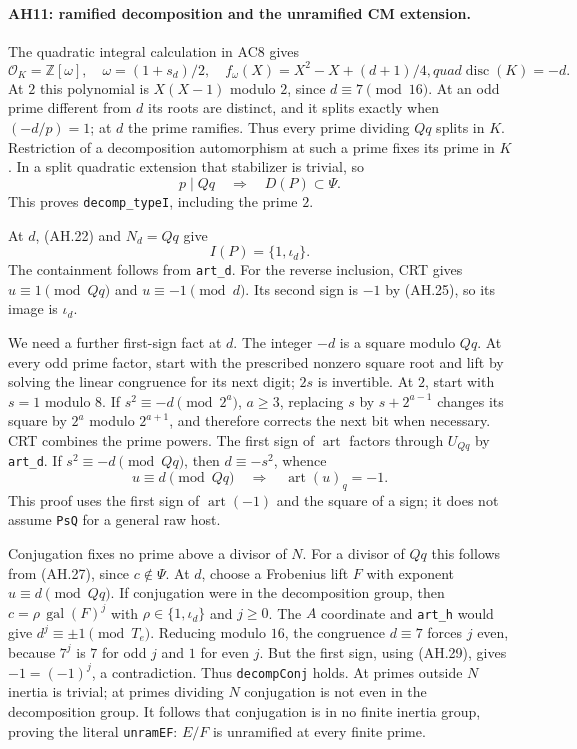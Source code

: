 \paragraph{AH11: ramified decomposition and the unramified CM extension.}
The quadratic integral calculation in AC8 gives
\[
 \mathcal O_K=\mathbb Z[\omega],\quad
 \omega=(1+s_d)/2,\quad
 f_\omega(X)=X^2-X+(d+1)/4,quad \operatorname{disc}(K)=-d.
                                                               \tag{AH.26}
\]
At $2$ this polynomial is $X(X-1)$ modulo $2$, since $d\equiv7\pmod{16}$.
At an odd prime different from $d$ its roots are distinct, and it splits
exactly when $(-d/p)=1$; at $d$ the prime ramifies. Thus every prime
dividing $Qq$ splits in $K$. Restriction of a decomposition automorphism
at such a prime fixes its prime in $K$. In a split quadratic extension
that stabilizer is trivial, so
\[
              p\mid Qq\quad\Longrightarrow\quad D(P)\subset\Psi.
                                                               \tag{AH.27}
\]
This proves \texttt{decomp\_typeI}, including the prime $2$.

At $d$, (AH.22) and $N_d=Qq$ give
\[
                     I(P)=\{1,\iota_d\}.        \tag{AH.28}
\]
The containment follows from \texttt{art\_d}. For the reverse inclusion,
CRT gives $u\equiv1\pmod{Qq}$ and $u\equiv-1\pmod d$.
Its second sign is $-1$ by (AH.25), so its image is $\iota_d$.

We need a further first-sign fact at $d$. The integer $-d$ is a square
modulo $Qq$. At every odd prime factor, start with the prescribed
nonzero square root and lift by solving the linear congruence for its
next digit; $2s$ is invertible. At $2$, start with $s=1$ modulo $8$.
If $s^2\equiv-d\pmod{2^a}$, $a\ge3$, replacing $s$ by
$s+2^{a-1}$ changes its square by $2^a$ modulo $2^{a+1}$, and therefore
corrects the next bit when necessary. CRT combines the prime powers.
The first sign of $\operatorname{art}$ factors through $U_{Qq}$ by
\texttt{art\_d}. If $s^2\equiv-d\pmod{Qq}$, then $d\equiv-s^2$, whence
\[
 u\equiv d\pmod{Qq}\quad\Longrightarrow\quad
              \operatorname{art}(u)_q=-1.       \tag{AH.29}
\]
This proof uses the first sign of $\operatorname{art}(-1)$ and the square
of a sign; it does not assume \texttt{PsQ} for a general raw host.

Conjugation fixes no prime above a divisor of $N$. For a divisor of $Qq$
this follows from (AH.27), since $c\notin\Psi$. At $d$, choose a
Frobenius lift $F$ with exponent $u\equiv d\pmod{Qq}$. If conjugation
were in the decomposition group, then
$c=\rho\,\operatorname{gal}(F)^j$ with
$\rho\in\{1,\iota_d\}$ and $j\ge0$. The $A$ coordinate and
\texttt{art\_h} would give $d^j\equiv\pm1\pmod{T_e}$.
Reducing modulo $16$, the congruence $d\equiv7$ forces $j$ even, because
$7^j$ is $7$ for odd $j$ and $1$ for even $j$.
But the first sign, using (AH.29), gives $-1=(-1)^j$, a contradiction.
Thus \texttt{decompConj} holds. At primes outside $N$ inertia is trivial;
at primes dividing $N$ conjugation is not even in the decomposition group.
It follows that conjugation is in no finite inertia group, proving the
literal \texttt{unramEF}: $E/F$ is unramified at every finite prime.

